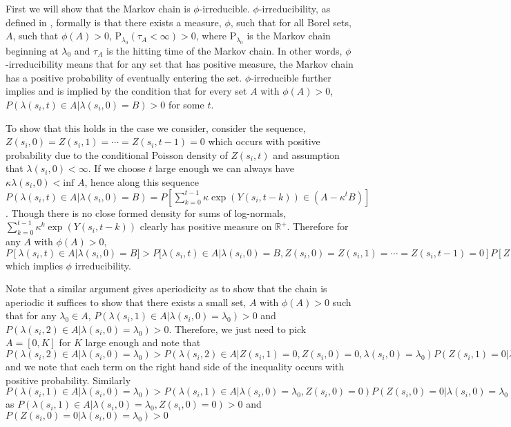 \documentclass[11pt]{isuthesis}
\begin{document}
First we will show that the Markov chain is $\phi$-irreducible.  $\phi$-irreducibility, as defined in \cite{meyn2012markov}, formally is that there exists a measure, $\phi$, such that for all Borel sets, $A$, such that $\phi(A)>0$, $\mbox{P}_{\lambda_0}(\tau_A<\infty)>0$, where $\mbox{P}_{\lambda_0}$ is the Markov chain beginning at $\lambda_0$ and $\tau_A$ is the hitting time of the Markov chain.  In other words, $\phi$-irreducibility means that for any set that has positive measure, the Markov chain has a positive probability of eventually entering the set.  $\phi$-irreducible further implies and is implied by the condition that for every set $A$ with $\phi(A)>0$, $P(\lambda(s_i,t)\in A|\lambda(s_i,0)=B)>0$ for some $t$.  

To show that this holds in the case we consider, consider the sequence, $Z(s_i,0)=Z(s_i,1)=\cdots=Z(s_i,t-1)=0$ which occurs with positive probability due to the conditional Poisson density of $Z(s_i,t)$ and assumption that $\lambda(s_i,0)< \infty$.  If we choose $t$ large enough we can always have $\kappa\lambda(s_i,0) < \mbox{inf } A$, hence along this sequence $P(\lambda(s_i,t)\in A|\lambda(s_i,0)=B)= P[\sum_{k=0}^{t-1} \kappa\exp(Y(s_i,t-k))\in (A-\kappa^t B)]$.  Though there is no close formed density for sums of log-normals, $\sum_{k=0}^{t-1} \kappa^k\exp(Y(s_i,t-k))$ clearly has positive measure on $\mathbb{R}^{+}$.  Therefore for any $A$ with $\phi(A)>0$, $P[\lambda(s_i,t)\in A|\lambda(s_i,0)=B]>P[\lambda(s_i,t)\in A|\lambda(s_i,0)=B,Z(s_i,0)=Z(s_i,1)=\cdots=Z(s_i,t-1)=0]P[Z(s_i,0)=Z(s_i,1)=\cdots=Z(s_i,t-1)=0]|\lambda(s_i,0)=B>0$ which implies $\phi$ irreducibility.  

Note that a similar argument gives aperiodicity as to show that the chain is aperiodic it suffices to show that there exists a small set, $A$ with $\phi(A)>0$ such that for any $\lambda_0 \in A$, $P(\lambda(s_i,1)\in A |\lambda(s_i,0)=\lambda_0)>0$ and $P(\lambda(s_i,2)\in A |\lambda(s_i,0)=\lambda_0)>0$.  Therefore, we just need to pick $A=[0,K]$ for $K$ large enough and note that $P(\lambda(s_i,2)\in A |\lambda(s_i,0)=\lambda_0)>P(\lambda(s_i,2)\in A |Z(s_i,1)=0,Z(s_i,0)=0, \lambda(s_i,0)=\lambda_0)P(Z(s_i,1)=0|\lambda(s_i,0)=\lambda_0,Z(s_i,0)=0)P(Z(s_i,0)|\lambda(s_i,0)=\lambda_0))$ and we note that each term on the right hand side of the inequality occurs with positive probability.  Similarly $P(\lambda(s_i,1)\in A |\lambda(s_i,0)=\lambda_0)>P(\lambda(s_i,1)\in A |\lambda(s_i,0)=\lambda_0,Z(s_i,0)=0)P(Z(s_i,0)=0|\lambda(s_i,0)=\lambda_0)>0$ as $P(\lambda(s_i,1)\in A |\lambda(s_i,0)=\lambda_0,Z(s_i,0)=0)>0$ and $P(Z(s_i,0)=0|\lambda(s_i,0)=\lambda_0)>0$
\end{document}
